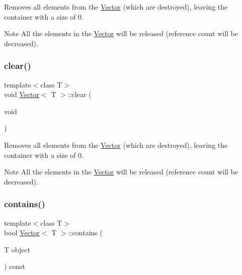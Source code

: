 Removes all elements from the \hyperlink{classVector}{Vector} (which are destroyed), leaving the container with a size of 0. 

\begin{DoxyNote}{Note}
All the elements in the \hyperlink{classVector}{Vector} will be released (reference count will be decreased). 
\end{DoxyNote}
\mbox{\label{classVector_a32ad98b135472b0ebc5d6cb3ae5d0085}} 
\subsubsection{\texorpdfstring{clear()}{clear()}\hspace{0.1cm}{\footnotesize\ttfamily [2/2]}}
{\footnotesize\ttfamily template$<$class T$>$ \\
void \hyperlink{classVector}{Vector}$<$ T $>$\+::clear (\begin{DoxyParamCaption}\item[{void}]{ }\end{DoxyParamCaption})\hspace{0.3cm}{\ttfamily [inline]}}



Removes all elements from the \hyperlink{classVector}{Vector} (which are destroyed), leaving the container with a size of 0. 

\begin{DoxyNote}{Note}
All the elements in the \hyperlink{classVector}{Vector} will be released (reference count will be decreased). 
\end{DoxyNote}
\mbox{\label{classVector_a20b0a89d6e0ee21d07315121867d84ef}} 
\subsubsection{\texorpdfstring{contains()}{contains()}\hspace{0.1cm}{\footnotesize\ttfamily [1/2]}}
{\footnotesize\ttfamily template$<$class T$>$ \\
bool \hyperlink{classVector}{Vector}$<$ T $>$\+::contains (\begin{DoxyParamCaption}\item[{T}]{object }\end{DoxyParamCaption}) const\hspace{0.3cm}{\ttfamily [inline]}}

